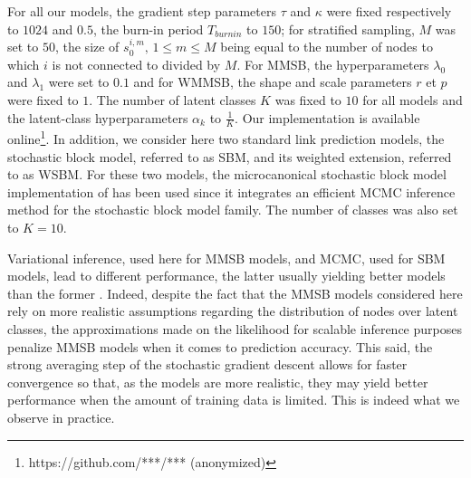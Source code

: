 For all our models, the gradient step parameters  $\tau$ and $\kappa$ were fixed respectively to  $1024$ and $0.5$, the burn-in period $T_{burnin}$ to $150$; for stratified sampling, $M$ was set to $50$, the size of $s_0^{i,m}, \, 1 \le m \le M$ being equal to the number of nodes to which $i$ is not connected to divided by $M$. For MMSB, the hyperparameters $\lambda_0$ and $\lambda_1$ were set to $0.1$ and for WMMSB, the shape and scale parameters $r$ et $p$ were fixed to $1$. The number of latent classes $K$ was fixed to $10$ for all models and the latent-class hyperparameters $\alpha_k$ to $\frac{1}{K}$. Our implementation is available online\footnote{https://github.com/***/*** (anonymized)}. In addition, we consider here two standard link prediction models, the stochastic block model, referred to as SBM, and its weighted extension, referred to as WSBM. For these two models, the microcanonical stochastic block model implementation of \cite{peixoto2018nonparametric} has been used since it integrates an efficient MCMC inference method for the stochastic block model family.  The number of classes was also set to $K=10$.

Variational inference, used here for MMSB models, and MCMC, used for SBM models, lead to different performance, the latter usually yielding better models than the former \cite{asuncion2009smoothing}. Indeed, despite the fact that the MMSB models considered here rely on more realistic assumptions regarding the distribution of nodes over latent classes, the approximations made on the likelihood for scalable inference purposes penalize MMSB models when it comes to prediction accuracy. This said, the strong averaging step of the stochastic gradient descent allows for faster convergence so that, as the models are more realistic, they may yield better performance when the amount of training data is limited. This is indeed what we observe in practice.


